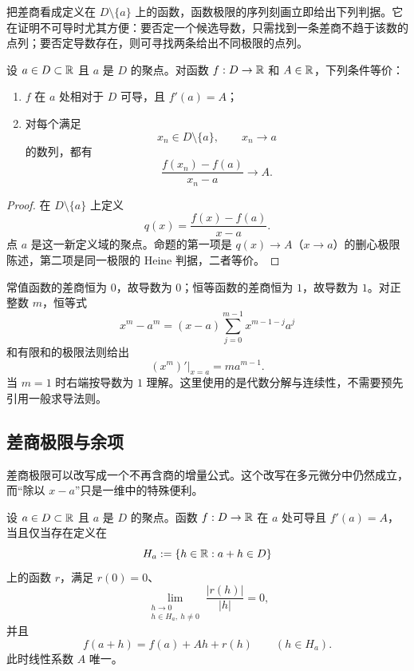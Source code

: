 把差商看成定义在 \(D\setminus\{a\}\) 上的函数，函数极限的序列刻画立即给出下列判据。它在证明不可导时尤其方便：要否定一个候选导数，只需找到一条差商不趋于该数的点列；要否定导数存在，则可寻找两条给出不同极限的点列。

\begin{proposition}[导数的序列判据]
\label{prop:derivative-sequential-criterion}
设 \(a\in D\subset\mathbb{R}\) 且 \(a\) 是 \(D\) 的聚点。对函数 \(f:D\to\mathbb{R}\) 和 \(A\in\mathbb{R}\)，下列条件等价：
\begin{enumerate}
 \item \(f\) 在 \(a\) 处相对于 \(D\) 可导，且 \(f'(a)=A\)；
 \item 对每个满足
 \[
  x_n\in D\setminus\{a\},\qquad x_n\to a
 \]
 的数列，都有
 \[
  \frac{f(x_n)-f(a)}{x_n-a}\longrightarrow A.
 \]
\end{enumerate}
\end{proposition}

\begin{proof}
在 \(D\setminus\{a\}\) 上定义
\[
 q(x)=\frac{f(x)-f(a)}{x-a}.
\]
点 \(a\) 是这一新定义域的聚点。命题的第一项是 \(q(x)\to A\)（\(x\to a\)）的删心极限陈述，第二项是同一极限的 Heine 判据，二者等价。
\end{proof}

\begin{example}
常值函数的差商恒为 \(0\)，故导数为 \(0\)；恒等函数的差商恒为 \(1\)，故导数为 \(1\)。对正整数 \(m\)，恒等式
\[
 x^m-a^m=(x-a)\sum_{j=0}^{m-1}x^{m-1-j}a^j
\]
和有限和的极限法则给出
\[
 (x^m)'\big|_{x=a}=ma^{m-1}.
\]
当 \(m=1\) 时右端按导数为 \(1\) 理解。这里使用的是代数分解与连续性，不需要预先引用一般求导法则。
\end{example}

\subsection{差商极限与余项}

差商极限可以改写成一个不再含商的增量公式。这个改写在多元微分中仍然成立，而“除以 \(x-a\)”只是一维中的特殊便利。

\begin{theorem}[可导与局部线性化]
\label{thm:derivative-linearization}
设 \(a\in D\subset\mathbb{R}\) 且 \(a\) 是 \(D\) 的聚点。函数 \(f:D\to\mathbb{R}\) 在 \(a\) 处可导且 \(f'(a)=A\)，当且仅当存在定义在
\[
 H_a:=\{h\in\mathbb{R}:a+h\in D\}
\]
上的函数 \(r\)，满足 \(r(0)=0\)、
\[
 \lim_{\substack{h\to0\\h\in H_a,\ h\ne0}}
 \frac{|r(h)|}{|h|}=0,
\]
并且
\[
 f(a+h)=f(a)+Ah+r(h)\qquad(h\in H_a).
\]
此时线性系数 \(A\) 唯一。
\end{theorem}

